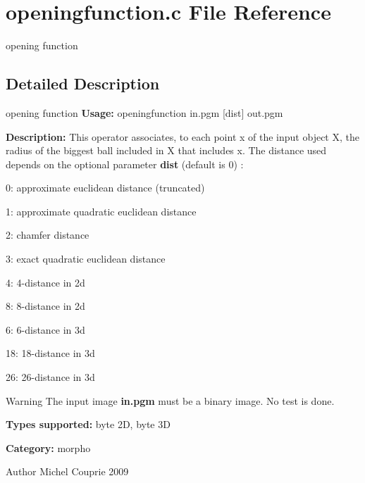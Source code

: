 \section{openingfunction.c File Reference}
\label{openingfunction_8c}


opening function  




\subsection{Detailed Description}
opening function {\bfseries Usage:} openingfunction in.pgm [dist] out.pgm

{\bfseries Description:} This operator associates, to each point x of the input object X, the radius of the biggest ball included in X that includes x. The distance used depends on the optional parameter {\bfseries dist} (default is 0) : \begin{DoxyItemize}
\item 0: approximate euclidean distance (truncated) \item 1: approximate quadratic euclidean distance \item 2: chamfer distance \item 3: exact quadratic euclidean distance \item 4: 4-\/distance in 2d \item 8: 8-\/distance in 2d \item 6: 6-\/distance in 3d \item 18: 18-\/distance in 3d \item 26: 26-\/distance in 3d\end{DoxyItemize}
\begin{DoxyWarning}{Warning}
The input image {\bfseries in.pgm} must be a binary image. No test is done.
\end{DoxyWarning}
{\bfseries Types supported:} byte 2D, byte 3D

{\bfseries Category:} morpho

\begin{DoxyAuthor}{Author}
Michel Couprie 2009 
\end{DoxyAuthor}
